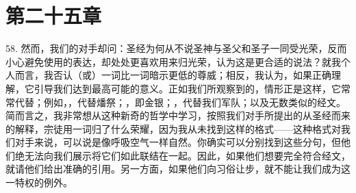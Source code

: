 
\section{第二十五章}

\par

58. 然而，我们的对手却问：圣经为何从不说圣神与圣父和圣子一同受光荣，反而小心避免使用的表达，却处处更喜欢用来归光荣，认为这是更合适的说法？就我个人而言，我否认（或）一词比一词暗示更低的尊威；相反，我认为，如果正确理解，它引导我们达到最高可能的意义。正如我们所观察到的，情形正是这样，它常常代替；例如，，代替燔祭；，即金银；，代替我们军队；以及无数类似的经文。简而言之，我非常想从这种新奇的哲学中学习，按照我们对手所提出的从圣经而来的解释，宗徒用一词归了什么荣耀，因为我从未找到这样的格式——这种格式对我们对手来说，可以说是像呼吸空气一样自然。你确实可以分别找到这些分句，但他们绝无法向我们展示将它们如此联结在一起。因此，如果他们想要完全符合经文，就请他们给出准确的引用。另一方面，如果他们向习俗让步，就不能让我们成为这一特权的例外。\par

